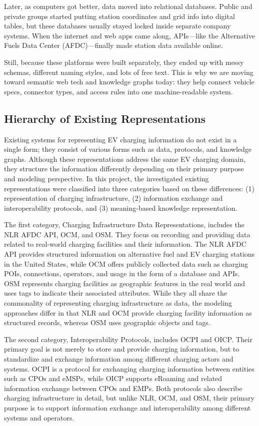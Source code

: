 \documentclass[sigconf]{acmart}
\begin{document}
Later, as computers got better, data moved into relational databases. Public and private groups started putting station coordinates and grid info into digital tables, but these databases usually stayed locked inside separate company systems. When the internet and web apps came along, APIs—like the Alternative Fuels Data Center (AFDC)—finally made station data available online.

Still, because these platforms were built separately, they ended up with messy schemas, different naming styles, and lots of free text. This is why we are moving toward semantic web tech and knowledge graphs today: they help connect vehicle specs, connector types, and access rules into one machine-readable system.

\subsection{Hierarchy of Existing Representations}

Existing systems for representing EV charging information do not exist in a single form; they consist of various forms such as data, protocols, and knowledge graphs. Although these representations address the same EV charging domain, they structure the information differently depending on their primary purpose and modeling perspective. In this project, the investigated existing representations were classified into three categories based on these differences: (1) representation of charging infrastructure, (2) information exchange and interoperability protocols, and (3) meaning-based knowledge representation.

The first category, Charging Infrastructure Data Representations, includes the NLR AFDC API, OCM, and OSM. They focus on recording and providing data related to real-world charging facilities and their information. The NLR AFDC API provides structured information on alternative fuel and EV charging stations in the United States, while OCM offers publicly collected data such as charging POIs, connections, operators, and usage in the form of a database and APIs. OSM represents charging facilities as geographic features in the real world and uses tags to indicate their associated attributes. While they all share the commonality of representing charging infrastructure as data, the modeling approaches differ in that NLR and OCM provide charging facility information as structured records, whereas OSM uses geographic objects and tags.

The second category, Interoperability Protocols, includes OCPI and OICP. Their primary goal is not merely to store and provide charging information, but to standardize and exchange information among different charging actors and systems. OCPI is a protocol for exchanging charging information between entities such as CPOs and eMSPs, while OICP supports eRoaming and related information exchange between CPOs and EMPs. Both protocols also describe charging infrastructure in detail, but unlike NLR, OCM, and OSM, their primary purpose is to support information exchange and interoperability among different systems and operators.
\end{document}
